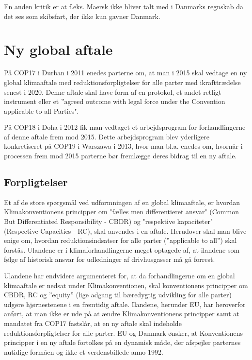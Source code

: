 En anden kritik er at f.eks. Maersk ikke bliver talt med i Danmarks regnskab da det ses som skibsfart, der ikke kun gavner Danmark.

\section{Ny global aftale}

På COP17 i Durban i 2011 enedes parterne om, at man i 2015 skal vedtage en ny global klimaaftale med reduktionsforpligtelser for alle parter med ikrafttrædelse senest i 2020. Denne aftale skal have form af en protokol, et andet retligt instrument eller et ”agreed outcome with legal force under the Convention applicable to all Parties". 

På COP18 i Doha i 2012 fik man vedtaget et arbejdsprogram for forhandlingerne af denne aftale frem mod 2015. Dette arbejdsprogram blev yderligere konkretiseret på COP19 i Warszawa i 2013, hvor man bl.a. enedes om, hvornår i processen frem mod 2015 parterne bør fremlægge deres bidrag til en ny aftale.

\subsection{Forpligtelser}

Et af de store spørgsmål ved udformningen af en global klimaaftale, er hvordan Klimakonventionens principper om "fælles men differentieret ansvar" (Common But Differentiated Responsibility - CBDR) og "respektive kapaciteter" (Respective Capacities - RC), skal anvendes i en aftale. Herudover skal man blive enige om, hvordan reduktionsindsatser for alle parter (”applicable to all”) skal forstås. Ulandene er i klimaforhandlingerne meget optagede af, at ilandene som følge af historisk ansvar for udledninger af drivhusgasser må gå forrest. 

Ulandene har endvidere argumenteret for, at da forhandlingerne om en global klimaaftale er nedsat under Klimakonventionen, skal konventionens principper om CBDR, RC og ”equity” (lige adgang til bæredygtig udvikling for alle parter) udgøre hjørnestenene i en fremtidig aftale. Ilandene, herunder EU, har heroverfor anført, at man ikke er ude på at ændre Klimakonventionens principper samt at mandatet fra COP17 fastslår, at en ny aftale skal indeholde reduktionsforpligtelser for alle parter. EU og Danmark ønsker, at Konventionens principper i en ny aftale fortolkes på en dynamisk måde, der afspejler parternes nutidige formåen og ikke et verdensbillede anno 1992.

